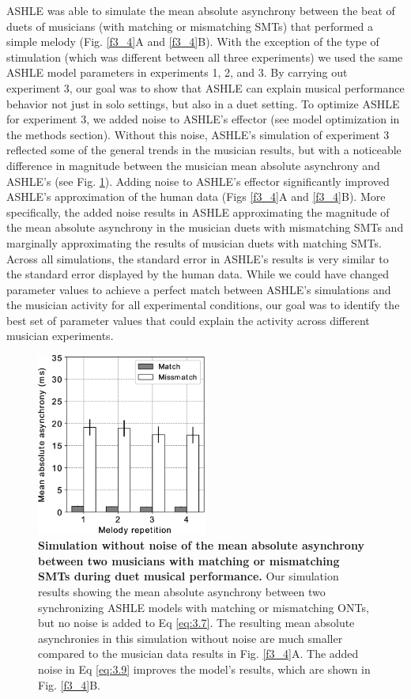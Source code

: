 \documentclass{report}
\begin{document}
ASHLE was able to simulate the mean absolute asynchrony between the beat of duets of musicians (with matching or mismatching SMTs) that performed a simple melody (Fig.{} \ref{f3_4}A and \ref{f3_4}B). With the exception of the type of stimulation (which was different between all three experiments) we used the same ASHLE model parameters in experiments 1, 2, and 3. By carrying out experiment 3, our goal was to show that ASHLE can explain musical performance behavior not just in solo settings, but also in a duet setting. To optimize ASHLE for experiment 3, we added noise to ASHLE's effector (see model optimization in the methods section). Without this noise, ASHLE's simulation of experiment 3 reflected some of the general trends in the musician results, but with a noticeable difference in magnitude between the musician mean absolute asynchrony and ASHLE's (see Fig.{} \ref{f3_5}). Adding noise to ASHLE's effector significantly improved ASHLE's approximation of the human data (Figs \ref{f3_4}A and \ref{f3_4}B). More specifically, the added noise results in ASHLE approximating the magnitude of the mean absolute asynchrony in the musician duets with mismatching SMTs and marginally approximating the results of musician duets with matching SMTs. Across all simulations, the standard error in ASHLE's results is very similar to the standard error displayed by the human data. While we could have changed parameter values to achieve a perfect match between ASHLE's simulations and the musician activity for all experimental conditions, our goal was to identify the best set of parameter values that could explain the activity across different musician experiments.

\begin{figure}
    \centering
    \includegraphics[width=0.5\textwidth]{figures/fig3_5.png}
    \caption[Simulation without noise of the mean absolute asynchrony between two musicians with matching or mismatching SMTs during duet musical performance]{\textbf{Simulation without noise of the mean absolute asynchrony between two musicians with matching or mismatching SMTs during duet musical performance.} Our simulation results showing the mean absolute asynchrony between two synchronizing ASHLE models with matching or mismatching ONTs, but no noise is added to Eq \eqref{eq:3.7}. The resulting mean absolute asynchronies in this simulation without noise are much smaller compared to the musician data results in Fig.{} \ref{f3_4}A. The added noise in Eq \eqref{eq:3.9} improves the model's results, which are shown in Fig.{} \ref{f3_4}B.}
    \label{f3_5}
\end{figure}
\end{document}
